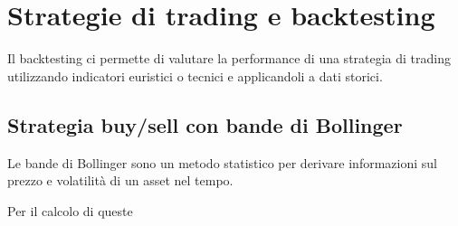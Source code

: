 
\section{Strategie di trading e backtesting}

Il backtesting ci permette di valutare la performance di una strategia di trading utilizzando
indicatori euristici o tecnici e applicandoli a dati storici.

\subsection{Strategia buy/sell con bande di Bollinger}

Le bande di Bollinger sono un metodo statistico per derivare informazioni sul prezzo e volatilità di un asset
nel tempo.

Per il calcolo di queste 
